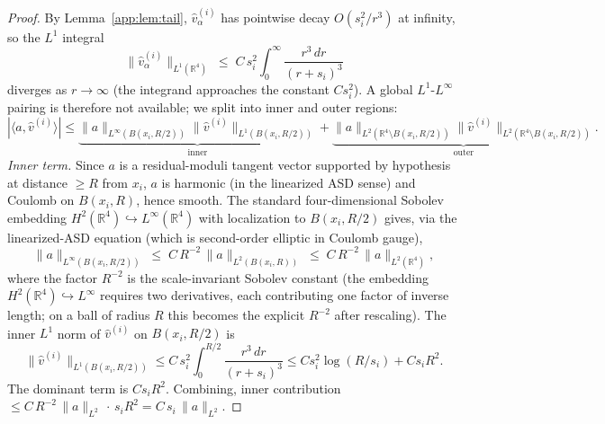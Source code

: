 \documentclass[11pt,letterpaper]{article}
\theoremstyle{definition}
\newcommand{\bbR}{\mathbb{R}}
\begin{document}
\begin{proof}
By Lemma~\ref{app:lem:tail}, $\hat v_\alpha^{(i)}$ has pointwise decay $O(s_i^2/r^3)$ at infinity, so the $L^1$ integral
\[
\|\hat v_\alpha^{(i)}\|_{L^1(\bbR^4)} \;\le\; C\,s_i^2\!\int_0^\infty\!\frac{r^3\,dr}{(r+s_i)^3}
\]
diverges as $r\to\infty$ (the integrand approaches the constant $C s_i^2$). A global $L^1$-$L^\infty$ pairing is therefore not available; we split into inner and outer regions:
\[
|\langle a, \hat v^{(i)}\rangle| \le \underbrace{\|a\|_{L^\infty(B(x_i, R/2))}\|\hat v^{(i)}\|_{L^1(B(x_i, R/2))}}_{\mathrm{inner}} + \underbrace{\|a\|_{L^2(\bbR^4\setminus B(x_i, R/2))}\|\hat v^{(i)}\|_{L^2(\bbR^4\setminus B(x_i, R/2))}}_{\mathrm{outer}}.
\]
\emph{Inner term.} Since $a$ is a residual-moduli tangent vector supported by hypothesis at distance $\ge R$ from $x_i$, $a$ is harmonic (in the linearized ASD sense) and Coulomb on $B(x_i, R)$, hence smooth. The standard four-dimensional Sobolev embedding $H^2(\bbR^4) \hookrightarrow L^\infty(\bbR^4)$ with localization to $B(x_i, R/2)$ gives, via the linearized-ASD equation (which is second-order elliptic in Coulomb gauge),
\[
\|a\|_{L^\infty(B(x_i, R/2))} \;\le\; C\,R^{-2}\,\|a\|_{L^2(B(x_i, R))} \;\le\; C\,R^{-2}\,\|a\|_{L^2(\bbR^4)},
\]
where the factor $R^{-2}$ is the scale-invariant Sobolev constant (the embedding $H^2(\bbR^4)\hookrightarrow L^\infty$ requires two derivatives, each contributing one factor of inverse length; on a ball of radius $R$ this becomes the explicit $R^{-2}$ after rescaling). The inner $L^1$ norm of $\hat v^{(i)}$ on $B(x_i, R/2)$ is
\[
\|\hat v^{(i)}\|_{L^1(B(x_i, R/2))} \le C\,s_i^2\!\int_0^{R/2}\!\frac{r^3\,dr}{(r+s_i)^3} \le C s_i^2 \log(R/s_i) + C s_i R^2.
\]
The dominant term is $C s_i R^2$. Combining, inner contribution $\le C\,R^{-2}\,\|a\|_{L^2}\,\cdot\, s_i R^2 = C\,s_i\,\|a\|_{L^2}$.


\end{proof}
\end{document}

